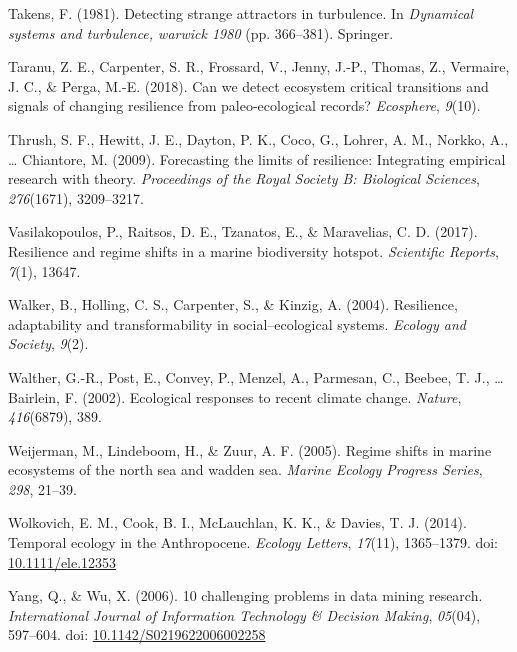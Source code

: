 \documentclass[12pt,twoside,openany]{reedthesis}
\begin{document}
\leavevmode\hypertarget{ref-takens1981detecting}{}%
Takens, F. (1981). Detecting strange attractors in turbulence. In \emph{Dynamical systems and turbulence, warwick 1980} (pp. 366--381). Springer.

\leavevmode\hypertarget{ref-taranu2018can}{}%
Taranu, Z. E., Carpenter, S. R., Frossard, V., Jenny, J.-P., Thomas, Z., Vermaire, J. C., \& Perga, M.-E. (2018). Can we detect ecosystem critical transitions and signals of changing resilience from paleo-ecological records? \emph{Ecosphere}, \emph{9}(10).

\leavevmode\hypertarget{ref-thrush2009forecasting}{}%
Thrush, S. F., Hewitt, J. E., Dayton, P. K., Coco, G., Lohrer, A. M., Norkko, A., \ldots{} Chiantore, M. (2009). Forecasting the limits of resilience: Integrating empirical research with theory. \emph{Proceedings of the Royal Society B: Biological Sciences}, \emph{276}(1671), 3209--3217.

\leavevmode\hypertarget{ref-vasilakopoulos2017resilience}{}%
Vasilakopoulos, P., Raitsos, D. E., Tzanatos, E., \& Maravelias, C. D. (2017). Resilience and regime shifts in a marine biodiversity hotspot. \emph{Scientific Reports}, \emph{7}(1), 13647.

\leavevmode\hypertarget{ref-walker2004resilience}{}%
Walker, B., Holling, C. S., Carpenter, S., \& Kinzig, A. (2004). Resilience, adaptability and transformability in social--ecological systems. \emph{Ecology and Society}, \emph{9}(2).

\leavevmode\hypertarget{ref-walther_ecological_2002}{}%
Walther, G.-R., Post, E., Convey, P., Menzel, A., Parmesan, C., Beebee, T. J., \ldots{} Bairlein, F. (2002). Ecological responses to recent climate change. \emph{Nature}, \emph{416}(6879), 389.

\leavevmode\hypertarget{ref-weijerman2005regime}{}%
Weijerman, M., Lindeboom, H., \& Zuur, A. F. (2005). Regime shifts in marine ecosystems of the north sea and wadden sea. \emph{Marine Ecology Progress Series}, \emph{298}, 21--39.

\leavevmode\hypertarget{ref-wolkovich_temporal_2014}{}%
Wolkovich, E. M., Cook, B. I., McLauchlan, K. K., \& Davies, T. J. (2014). Temporal ecology in the Anthropocene. \emph{Ecology Letters}, \emph{17}(11), 1365--1379. doi: \href{https://doi.org/10.1111/ele.12353}{10.1111/ele.12353}

\leavevmode\hypertarget{ref-yang_10_2006}{}%
Yang, Q., \& Wu, X. (2006). 10 challenging problems in data mining research. \emph{International Journal of Information Technology \& Decision Making}, \emph{05}(04), 597--604. doi: \href{https://doi.org/10.1142/S0219622006002258}{10.1142/S0219622006002258}
\end{document}

